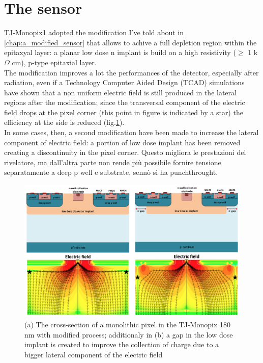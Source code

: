 \section{The sensor}
    TJ-Monopix1 adopted the modification I've told about in \ref{chap:a_modified_sensor} that allows to achive a full depletion region within the epitaxyal layer: a planar low dose n implant is build on a high resistivity ($\geq $ 1 k$\Omega$ cm), p-type epitaxial layer.\\
    The modification improves a lot the performances of the detector, especially after radiation, even if a Technology Computer Aided Design (TCAD) simulations have shown that a non uniform electric field is still produced in the lateral regions after the modification; since the transversal component of the electric field drops at the pixel corner (this point in figure is indicated by a star) the efficiency at the side is reduced  (fig.\ref{fig:Monopix1_section_scheme}). \\
    In some cases, then, a second modification have been made to increase the lateral component of electric field: a portion of low dose implant has been removed creating a discontinuity in the pixel corner. Questo migliora le prestazioni del rivelatore, ma dall'altra parte non rende più possibile fornire tensione separatamente a deep p well e substrate, sennò si ha punchthrought.
    \begin{figure}[h!]
        \centering
        \includegraphics[width=.9\linewidth]{figures/Monopix1/Monopix1_section_scheme.png}
        \caption{(a) The cross-section of a monolithic pixel in the TJ-Monopix 180 nm with modified process; additionaly in (b) a gap in the low dose implant is created to improve the collection of charge due to a bigger lateral component of the electric field}
        \label{fig:Monopix1_section_scheme}
    \end{figure}
